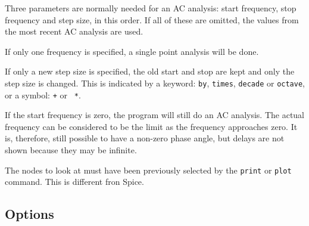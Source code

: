 Three parameters are normally needed for an AC analysis: start frequency,
stop frequency and step size, in this order.  If all of these are omitted,
the values from the most recent AC analysis are used.

If only one frequency is specified, a single point analysis will be done.

If only a new step size is specified, the old start and stop are kept and
only the step size is changed.  This is indicated by a keyword: {\tt by},
{\tt times}, {\tt decade} or {\tt octave}, or a symbol: {\tt +} or {\tt
*}.

If the start frequency is zero, the program will still do an AC analysis.
The actual frequency can be considered to be the limit as the frequency
approaches zero.  It is, therefore, still possible to have a non-zero
phase angle, but delays are not shown because they may be infinite.

The nodes to look at must have been previously selected by the {\tt print} or
{\tt plot} command.  This is different fron Spice.
\subsection{Options}

